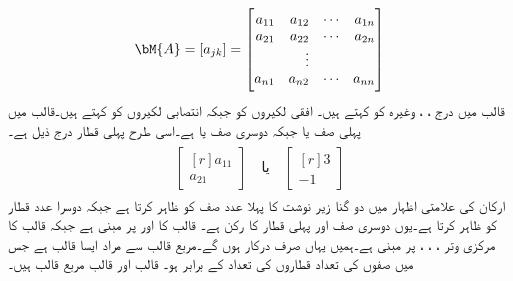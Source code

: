 \begin{align}\label{مساوات_نظام_متعدد_جمع_متعدد_قالب}
\bM{A}=[a_{jk}]=
\begin{bmatrix*}[r]
a_{11} & a_{12} &\cdots & a_{1n}\\
a_{21} & a_{22}& \cdots & a_{2n}\\
& \vdots &  &\\
a_{n1} & a_{n2}& \cdots & a_{nn}
\end{bmatrix*}
\end{align}
قالب میں درج ، ،  وغیرہ کو  کہتے ہیں۔ افقی لکیروں کو  جبکہ انتصابی  لکیروں کو  کہتے ہیں۔قالب  میں پہلی صف  یا  جبکہ دوسری  صف  یا  ہے۔اسی طرح پہلی  قطار درج ذیل ہے۔
\begin{gather*}
\begin{aligned}
\begin{bmatrix*}[r]
a_{11}\\
a_{21}
\end{bmatrix*}\quad \text{یا}\quad 
\begin{bmatrix*}[r]
3\\
-1
\end{bmatrix*}
\end{aligned}
\end{gather*}
ارکان کی علامتی اظہار میں دو گنا زیر نوشت کا  پہلا عدد صف کو ظاہر کرتا ہے جبکہ دوسرا عدد قطار کو ظاہر کرتا ہے۔یوں  دوسری صف اور پہلی قطار کا رکن ہے۔ قالب  کا   اور  پر مبنی ہے جبکہ قالب  کا مرکزی وتر ، ، ،  پر مبنی ہے۔ہمیں یہاں صرف  درکار ہوں گے۔مربع قالب سے مراد ایسا قالب ہے جس میں صفوں کی تعداد قطاروں کی تعداد کے برابر ہو۔ قالب  اور قالب  مربع قالب ہیں۔

